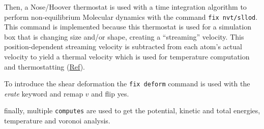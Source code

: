 \documentclass[main.tex]{subfiles}
\begin{document}
Then, a Nose/Hoover thermostat is used with a time integration algorithm to perform non-equilibrium Molecular dynamics with the command \verb|fix nvt/sllod|.
This command is implemented because this thermostat is used for a simulation box that is changing size and/or shape, creating a ``streaming'' velocity.
This position-dependent streaming velocity is subtracted from each atom’s actual velocity to yield a thermal velocity which is used for temperature computation and thermostatting (\href{https://docs.lammps.org/fix_nvt_sllod.html#evans3}{Ref}).

To introduce the shear deformation the \verb|fix deform| command is used with the \textit{erate} keyword and remap $v$ and flip yes.


finally, multiple \verb|computes| are used to get the potential, kinetic and total energies, temperature and voronoi analysis.
	
	
	
\end{document}

